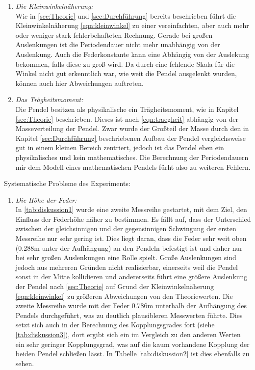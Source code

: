 \begin{enumerate}
    \item \textit{Die Kleinwinkelnäherung:}\\
        Wie in \ref{sec:Theorie} und \ref{sec:Durchführung} bereits beschrieben führt die Kleinwinkelnäherung \eqref{eqn:kleinwinkel}
        zu einer vereinfachten, aber auch mehr oder weniger stark fehlerbehafteten Rechnung. Gerade bei großen Auslenkungen ist die
        Periodendauer nicht mehr unabhängig von der Auslenkung. Auch die Federkonstante kann eine Abhängig von
        der Auslekung bekommen, falls diese zu groß wird. Da durch eine fehlende Skala für die Winkel nicht gut erkenntlich war,
        wie weit die Pendel ausgelenkt wurden, können auch hier Abweichungen auftreten.
    \item \textit{Das Trägheitsmoment:}\\
        Die Pendel besitzen als physikalische ein Trägheitsmoment, wie in Kapitel \ref{sec:Theorie} beschrieben. Dieses ist nach
        \eqref{eqn:traegheit} abhängig von der Masseverteilung der Pendel. Zwar wurde der Großteil der Masse durch den in
        Kapitel \ref{sec:Durchführung} beschriebenen Aufbau der Pendel vergleichsweise gut in einem kleinen Bereich zentriert,
        jedoch ist das Pendel eben ein physikalisches und kein mathematisches. Die Berechnung der Periodendauern mir dem
        Modell eines mathematischen Pendels fürht also zu weiteren Fehlern.
\end{enumerate}
Systematische Probleme des Experiments:
\begin{enumerate}
    \item \textit{Die Höhe der Feder:} \\
    In \ref{tab:diskussion1} wurde eine zweite Messreihe gestartet, mit dem Ziel, den Einfluss der Federhöhe näher zu bestimmen.
    Es fällt auf, dass der Unterschied zwischen der gleichsinnigen und der gegensinnigen Schwingung der ersten Messreihe nur sehr gering ist.
    Dies liegt daran, dass die Feder sehr weit oben (0.288m unter der Aufhängung) an den Pendeln befestigt ist und daher nur bei sehr großen
    Auslenkungen eine Rolle spielt. Große Auslenkungen sind jedoch aus mehreren Gründen nicht realisierbar, einerseits weil die Pendel sonst
    in der Mitte kollidieren und andererseits führt eine größere Auslenkung der Pendel nach \ref{sec:Theorie} auf Grund der Kleinwinkelnäherung
    \eqref{eqn:kleinwinkel} zu größeren Abweichungen von den Theoriewerten. Die zweite Messreihe wurde mit der
    Feder 0.786m unterhalb der Aufhängung des Pendels durchgeführt, was zu
    deutlich plausibleren Messwerten führte. Dies setzt sich auch in der Berechnung des Kopplungsgrades fort (siehe \ref{tab:diskussion3}),
    dort ergibt sich ein im Vergleich zu den anderen Werten ein sehr geringer Kopplungsgrad, was auf die kaum vorhandene Kopplung der beiden Pendel schließen lässt.
    In Tabelle \ref{tab:diskussion2} ist dies ebenfalls zu sehen.
\end{enumerate}

